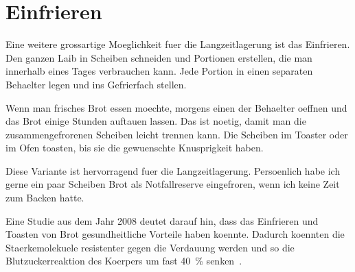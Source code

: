 \section{Einfrieren}

Eine weitere grossartige Moeglichkeit fuer die Langzeitlagerung ist das
Einfrieren. Den ganzen Laib in Scheiben schneiden und Portionen erstellen, die
man innerhalb eines Tages verbrauchen kann. Jede Portion in einen separaten
Behaelter legen und ins Gefrierfach stellen.

Wenn man frisches Brot essen moechte, morgens einen der Behaelter oeffnen und
das Brot einige Stunden auftauen lassen. Das ist noetig, damit man die
zusammengefrorenen Scheiben leicht trennen kann. Die Scheiben im Toaster oder
im Ofen toasten, bis sie die gewuenschte Knusprigkeit haben.

Diese Variante ist hervorragend fuer die Langzeitlagerung. Persoenlich habe
ich gerne ein paar Scheiben Brot als Notfallreserve eingefroren, wenn ich
keine Zeit zum Backen hatte.

Eine Studie aus dem Jahr 2008 deutet darauf hin, dass das Einfrieren und
Toasten von Brot gesundheitliche Vorteile haben koennte. Dadurch koennten die
Staerkemolekuele resistenter gegen die Verdauung werden und so die
Blutzuckerreaktion des Koerpers um fast \qty{40}{\percent}
senken~\cite{freezing+toasting+bread}.
